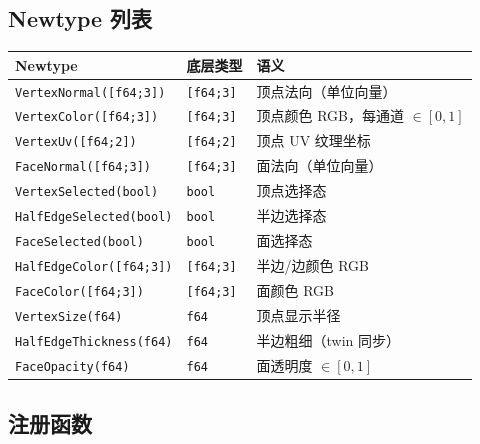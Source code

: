 \documentclass[11pt,a4paper]{article}
\begin{document}
\subsection{Newtype 列表}

\begin{center}
\renewcommand{\arraystretch}{1.18}
\begin{tabular}{@{}lll@{}}
  \toprule
  \textbf{Newtype} & \textbf{底层类型} & \textbf{语义} \\
  \midrule
  \texttt{VertexNormal([f64;3])}    & \texttt{[f64;3]} & 顶点法向（单位向量） \\
  \texttt{VertexColor([f64;3])}     & \texttt{[f64;3]} & 顶点颜色 RGB，每通道 $\in [0, 1]$ \\
  \texttt{VertexUv([f64;2])}        & \texttt{[f64;2]} & 顶点 UV 纹理坐标 \\
  \texttt{FaceNormal([f64;3])}      & \texttt{[f64;3]} & 面法向（单位向量） \\
  \texttt{VertexSelected(bool)}     & \texttt{bool}    & 顶点选择态 \\
  \texttt{HalfEdgeSelected(bool)}   & \texttt{bool}    & 半边选择态 \\
  \texttt{FaceSelected(bool)}       & \texttt{bool}    & 面选择态 \\
  \texttt{HalfEdgeColor([f64;3])}   & \texttt{[f64;3]} & 半边/边颜色 RGB \\
  \texttt{FaceColor([f64;3])}       & \texttt{[f64;3]} & 面颜色 RGB \\
  \texttt{VertexSize(f64)}          & \texttt{f64}     & 顶点显示半径 \\
  \texttt{HalfEdgeThickness(f64)}   & \texttt{f64}     & 半边粗细（twin 同步） \\
  \texttt{FaceOpacity(f64)}         & \texttt{f64}     & 面透明度 $\in [0, 1]$ \\
  \bottomrule
\end{tabular}
\end{center}

\subsection{注册函数}
\end{document}
